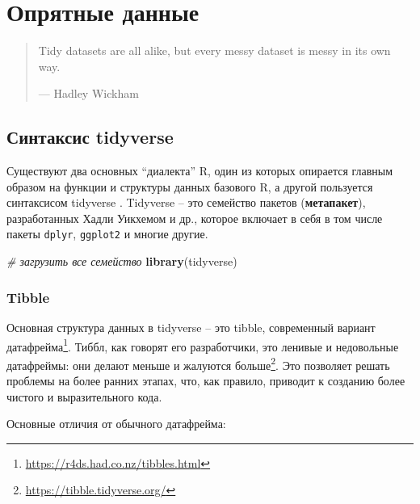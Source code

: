 \documentclass[
]{book}
\newenvironment{Shaded}{\begin{snugshade}}{\end{snugshade}}
\newcommand{\CommentTok}[1]{\textcolor[rgb]{0.56,0.35,0.01}{\textit{#1}}}
\newcommand{\FunctionTok}[1]{\textcolor[rgb]{0.13,0.29,0.53}{\textbf{#1}}}
\newcommand{\NormalTok}[1]{#1}
\theoremstyle{definition}
\theoremstyle{definition}
\theoremstyle{definition}
\theoremstyle{definition}
\theoremstyle{remark}
\begin{document}
\hypertarget{ux43eux43fux440ux44fux442ux43dux44bux435-ux434ux430ux43dux43dux44bux435}{%
\chapter{Опрятные данные}\label{ux43eux43fux440ux44fux442ux43dux44bux435-ux434ux430ux43dux43dux44bux435}}

\begin{quote}
Tidy datasets are all alike, but every messy dataset is messy in its own way.

--- Hadley Wickham
\end{quote}

\hypertarget{ux441ux438ux43dux442ux430ux43aux441ux438ux441-tidyverse}{%
\section{Синтаксис tidyverse}\label{ux441ux438ux43dux442ux430ux43aux441ux438ux441-tidyverse}}

Существуют два основных ``диалекта'' R, один из которых опирается главным образом на функции и структуры данных базового R, а другой пользуется синтаксисом tidyverse \citep{winter2020}. Tidyverse -- это семейство пакетов (\textbf{метапакет}), разработанных Хадли Уикхемом и др., которое включает в себя в том числе пакеты \texttt{dplyr}, \texttt{ggplot2} и многие другие.

\begin{Shaded}
\begin{Highlighting}[]
\CommentTok{\# загрузить все семейство}
\FunctionTok{library}\NormalTok{(tidyverse)}
\end{Highlighting}
\end{Shaded}

\hypertarget{tibble}{%
\subsection{Tibble}\label{tibble}}

Основная структура данных в tidyverse -- это tibble, современный вариант датафрейма\footnote{\url{https://r4ds.had.co.nz/tibbles.html}}. Тиббл, как говорят его разработчики, это ленивые и недовольные датафреймы: они делают меньше и жалуются больше\footnote{\url{https://tibble.tidyverse.org/}}. Это позволяет решать проблемы на более ранних этапах, что, как правило, приводит к созданию более чистого и выразительного кода.

Основные отличия от обычного датафрейма:
\end{document}
